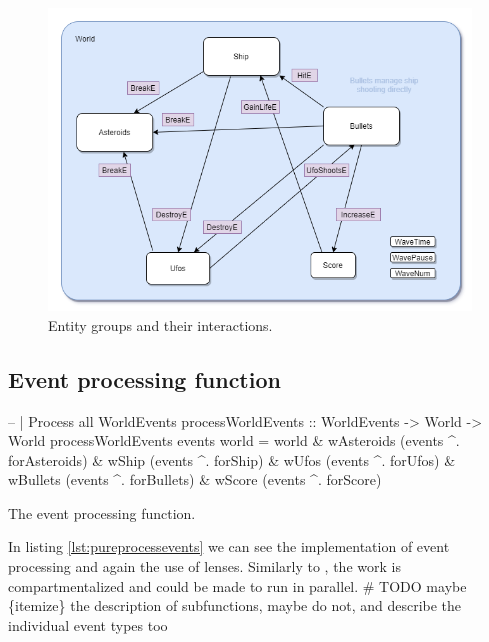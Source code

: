 \documentclass[
  digital, %
  color,   %
  table,   %
  oneside, %
  lof,     %
  lot,     %
]{fithesis3}
\begin{document}
{%
\begin{figure}
    \centering
    \includegraphics[width=\textwidth]{images/entity-relationships-transparent-bg.png}
    \caption{Entity groups and their interactions.}
    \label{fig:entitygroups}
\end{figure}


\subsection{Event processing function}

\begin{listing}
\begin{haskell}
-- | Process all WorldEvents
processWorldEvents :: WorldEvents -> World -> World
processWorldEvents events world =
    world
      & wAsteroids %
                        (events ^. forAsteroids)
      & wShip      %
                        (events ^. forShip)
      & wUfos      %
                        (events ^. forUfos)
      & wBullets   %
                        (events ^. forBullets)
      & wScore     %
                        (events ^. forScore)
\end{haskell}
\caption{The event processing function.}
\label{lst:pureprocessevents}
\end{listing}

In listing \ref{lst:pureprocessevents} we can see the implementation of
event processing and again the use of lenses.
Similarly to , the work is compartmentalized
and could be made to run in parallel.
\# TODO maybe \{itemize\} the description of subfunctions,
maybe do not, and describe the individual event types too


}
\end{document}
